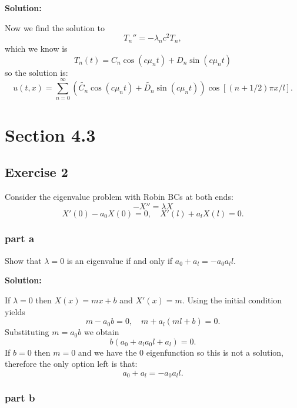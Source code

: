 \documentclass{article}
\begin{document}
\textbf{Solution:}

Now we find the solution to
\[
    T_n''=-\lambda_nc^2T_n,
\]
which we know is
\[
T_n(t)=C_n\cos(c\mu_n t) + D_n\sin(c\mu_n t)
\]
so the solution is:
\[
u(t,x)=\sum_{n=0}^\infty \left(\widetilde{C_n}\cos(c\mu_n t) +
    \widetilde{D_n}\sin(c\mu_n t)\right)\cos\left[\left(n+1/2\right)\pi
x/l\right].
\]
\section{Section 4.3}
\subsection{Exercise 2}
Consider the eigenvalue problem with Robin BCs at both ends:
\[
    -X''=\lambda X
\]
\[
    X'(0)-a_0X(0)=0, \quad X'(l)+a_lX(l)=0.
\]
\subsubsection{part a}
Show that $\lambda = 0$ is an eigenvalue if and only if $a_0+a_l=-a_0a_ll$.

\textbf{Solution:}

If $\lambda=0$ then $X(x)=mx+b$ and $X'(x)=m$. Using the initial condition
yields
\[
    m-a_0b=0, \quad m+a_l(ml+b)=0.
\]
Substituting $m=a_0b$ we obtain
\[
    b(a_0+a_la_0l+a_l)=0.
\]
If $b=0$ then $m=0$ and we have the 0 eigenfunction so this is not a solution,
therefore the only option left is that:
\[
    a_0+a_l=-a_0a_ll.
\]
\subsubsection{part b}
\end{document}
